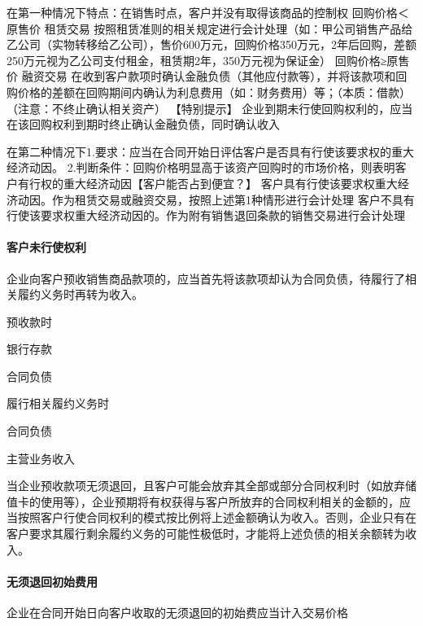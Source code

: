 \documentclass[UTF8,12pt]{ctexart}
\newenvironment{Dr}{%
	\begin{list}{}%
		{
			\setlength{\leftmargin}{2em}
			\setlength{\labelwidth}{2em}
			\setlength{\labelsep}{0pt}
			\setlength{\itemindent}{0pt}
			\setlength{\listparindent}{0pt}
			\setlength{\parsep}{0pt}
			\setlength{\topsep}{0pt}
		}
		\item[\textbf{借：}]
	}{%
	\end{list}
}
\newenvironment{Cr}{%
	\begin{list}{}%
		{
			\setlength{\leftmargin}{2em}
			\setlength{\labelwidth}{2em}
			\setlength{\labelsep}{0pt}
			\setlength{\itemindent}{0pt}
			\setlength{\listparindent}{0pt}
			\setlength{\parsep}{0pt}
			\setlength{\topsep}{0pt}
		}
		\item[\textbf{贷：}]
	}{%
	\end{list}
}
\numberwithin{equation}{section} %
\numberwithin{figure}{section}
\numberwithin{table}{section}
\begin{document}
	在第一种情况下特点：在销售时点，客户并没有取得该商品的控制权
	回购价格＜原售价	租赁交易	按照租赁准则的相关规定进行会计处理（如：甲公司销售产品给乙公司（实物转移给乙公司），售价600万元，回购价格350万元，2年后回购，差额250万元视为乙公司支付租金，租赁期2年，350万元视为保证金）
	回购价格≥原售价	融资交易	在收到客户款项时确认金融负债（其他应付款等），并将该款项和回购价格的差额在回购期间内确认为利息费用（如：财务费用）等；（本质：借款）（注意：不终止确认相关资产）
	【特别提示】
	企业到期未行使回购权利的，应当在该回购权利到期时终止确认金融负债，同时确认收入
	
	在第二种情况下1.要求：应当在合同开始日评估客户是否具有行使该要求权的重大经济动因。
	2.判断条件：回购价格明显高于该资产回购时的市场价格，则表明客户有行权的重大经济动因【客户能否占到便宜？】
	客户具有行使该要求权重大经济动因。作为租赁交易或融资交易，按照上述第1种情形进行会计处理
	客户不具有行使该要求权重大经济动因的。作为附有销售退回条款的销售交易进行会计处理
	
	
	\paragraph{客户未行使权利}
	企业向客户预收销售商品款项的，应当首先将该款项却认为合同负债，待履行了相关履约义务时再转为收入。
	
	预收款时
	\begin{Dr}
		银行存款
	\end{Dr}
	\begin{Cr}
		合同负债
	\end{Cr}
	
	履行相关履约义务时
	\begin{Dr}
		合同负债
	\end{Dr}
	\begin{Cr}
		主营业务收入
	\end{Cr}
	
	当企业预收款项无须退回，且客户可能会放弃其全部或部分合同权利时（如放弃储值卡的使用等），企业预期将有权获得与客户所放弃的合同权利相关的金额的，应当按照客户行使合同权利的模式按比例将上述金额确认为收入。否则，企业只有在客户要求其履行剩余履约义务的可能性极低时，才能将上述负债的相关余额转为收入。
	
	
	\paragraph{无须退回初始费用}
	企业在合同开始日向客户收取的无须退回的初始费应当计入交易价格
	
\end{document}
